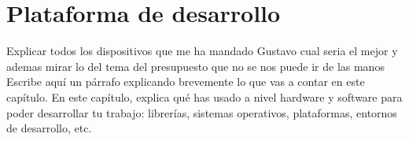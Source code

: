 \chapter{Plataforma de desarrollo}
\label{cap:capitulo3}


Explicar todos los dispositivos que me ha mandado Gustavo cual seria el mejor y ademas mirar lo del tema del presupuesto que no se nos puede ir de las manos
Escribe aquí un párrafo explicando brevemente lo que vas a contar en este capítulo. En este capítulo, explica qué has usado a nivel hardware y software para poder desarrollar tu trabajo: librerías, sistemas operativos, plataformas, entornos de desarrollo, etc.
